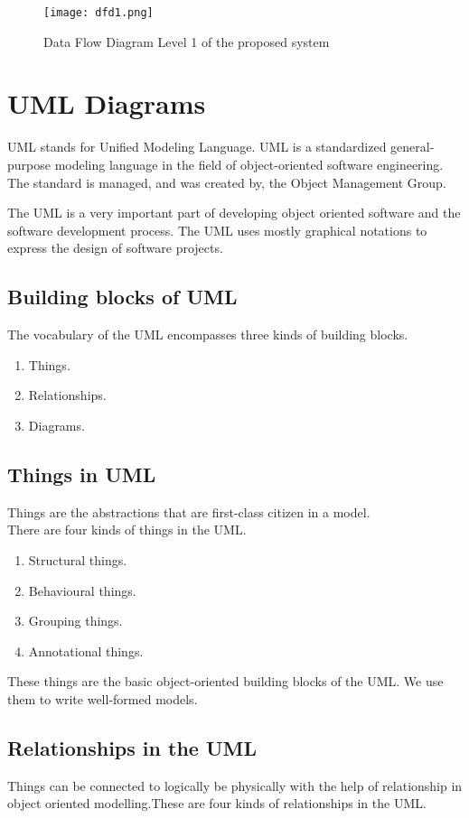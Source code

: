 \begin{center}
\begin{figure}[H]
\centering
\texttt{[image: dfd1.png]}
\caption{Data Flow Diagram Level 1 of the proposed system}
\end{figure}
\end{center}

\section{UML Diagrams}
UML stands for Unified Modeling Language. UML is a standardized general-purpose modeling language in the field of object-oriented software engineering. The standard is managed, and was created by, the Object Management Group. 
\par
The UML is a very important part of developing object oriented software and the software development process. The UML uses mostly graphical notations to express the design of software projects.\\
\subsection{Building blocks of UML}
The vocabulary of the UML encompasses three kinds of building blocks.
\begin{enumerate}
	\item Things.
	\item Relationships.
	\item Diagrams.
\end{enumerate}
\subsection{Things in UML}
Things are the abstractions that are first-class citizen in a model.\\
There are four kinds of things in the UML.
\begin{enumerate}
	\item Structural things.
	\item Behavioural things.
	\item Grouping things.
	\item Annotational things.
\end{enumerate}
These things are the basic object-oriented building blocks of the UML. We use them to write well-formed models.
\subsection{Relationships in the UML}
Things can be connected to logically be physically with the help of relationship in object oriented modelling.These are four kinds of relationships in the UML.

